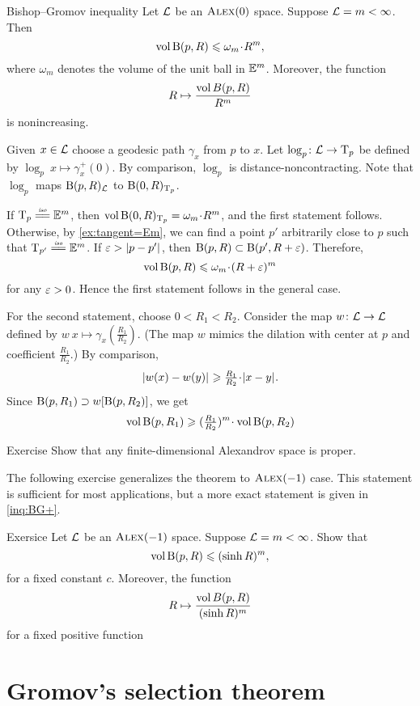 \begin{thm}{Bishop--Gromov inequality}\label{inq:BG}
Let $\mathcal{L}$ be an $\textsc{Alex}(0)$ space.
Suppose $\mathcal{L}=m<\infty$.
Then 
\[\vol \oBall(p,R)\le \omega_m\cdot R^m,\]
where $\omega_m$ denotes the volume of the unit ball in $\mathbb{E}^m$.
Moreover, the function 
\[R\mapsto \frac{\operatorname{\rm vol}\nolimits B(p,R)}{R^m}\]
is nonincreasing.
\end{thm}

Given $x\in\mathcal{L}$ choose a geodesic path $\gamma_x$ from $p$ to $x$.
Let $\log_p\colon\mathcal{L}\to \mathrm{T}_p$ be defined by $\log_p\:x\mapsto \gamma_x^+(0)$.
By comparison, $\log_p$ is distance-noncontracting.
Note that $\log_p$ maps $\mathrm{B}{}(p,R)_{\mathcal{L}}$ to $\mathrm{B}{}(0,R)_{\mathrm{T}_p}$.

If $\T_p\iso \EE^m$, then $\vol\oBall(0,R)_{\T_p}=\omega_m\cdot R^m$,
and the first statement follows.
Otherwise, by \ref{ex:tangent=Em}, we can find a point $p'$ arbitrarily close to $p$ such that $\T_{p'}\iso \EE^m$.
If $\eps>\dist{p}{p'}{}$, then $\mathrm{B}{}(p,R)\subset \mathrm{B}{}(p',R+\varepsilon)$.
Therefore,
\[\vol \oBall(p,R)\le \omega_m\cdot (R+\eps)^m\]
for any $\varepsilon>0$.
Hence the first statement follows in the general case.

For the second statement, choose $0<R_1<R_2$.
Consider the map $w\colon \mathcal{L}\to \mathcal{L}$ defined by $w\:x\mapsto \gamma_x(\tfrac {R_1}{R_2})$.
(The map $w$ mimics the dilation with center at $p$ and coefficient $\tfrac {R_1}{R_2}$.)
By comparison,
\[\dist{w(x)}{w(y)}{}\ge \tfrac {R_1}{R_2}\cdot \dist{x}{y}{}.\]
Since $\mathrm{B}{}(p,R_1) \supset w[\mathrm{B}{}(p,R_2)]$, we get 
\[\vol \oBall(p,R_1)\ge (\tfrac {R_1}{R_2})^m\cdot\vol \oBall(p,R_2)\]
\qedsf

\begin{thm}{Exercise}\label{ex:diam-compact}
Show that any finite-dimensional Alexandrov space is proper.
\end{thm}

The following exercise generalizes the theorem to $\textsc{Alex}(-1)$ case.
This statement is sufficient for most applications, but a more exact statement is given in \ref{inq:BG+}.

\begin{thm}{Exersice}\label{ex:BG}
Let $\mathcal{L}$ be an $\textsc{Alex}(-1)$ space.
Suppose $\mathcal{L}=m<\infty$.
Show that
\[\operatorname{\rm vol}\nolimits \mathrm{B}{}(p,R)\leqslant (\sinh R)^m,\]
for a fixed constant $c$.
Moreover, the function 
\[R\mapsto \frac{\operatorname{\rm vol}\nolimits B(p,R)}{(\sinh R)^m}\]
for a fixed positive function 
\end{thm}

\section{Gromov's selection theorem}

